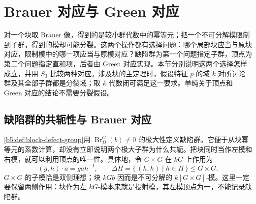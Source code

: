 
\section{Brauer 对应与 Green 对应}
\label{b5:sec:0806}

对一个块取 Brauer 像，得到的是较小群代数中的幂等元；把一个不可分解模限制到子群，得到的模却可能分裂。这两个操作都有选择问题：哪个局部块应当与原块对应，限制模中的哪一项应当与原模对应？缺陷群为第一个问题指定子群，顶点为第二个问题指定直和项，后者由 Green 对应实现。本节分别说明这两个选择怎样成立，并用 \(S_3\) 比较两种对应。涉及块的主定理时，假设特征 \(p\) 的域 \(k\) 对所讨论群及其全部子群都是分裂域；取 \(k\) 代数闭可满足这一要求。单纯关于顶点和 Green 对应的结论不需要分裂假设。

\subsection{缺陷群的共轭性与 Brauer 对应}
\label{b5:subsec:0806:01}

\cref{b5:def:block-defect-group}用 \(\operatorname{Br}_D^G(b)\ne0\) 的极大性定义缺陷群。它便于从块幂等元的系数计算，却没有立即说明两个极大子群为什么共轭。把块同时当作左模和右模，就可以利用顶点的唯一性。具体地，令 \(G\times G\) 在 \(kG\) 上作用为
\[
	(g,h)\cdot a=gah^{-1},\qquad
	\Delta H=\{\,(h,h)\mid h\in H\,\}\le G\times G.
\]
\(G\times G\) 的子模恰是双侧理想；块 \(kGb\) 因而是不可分解的 \(k[G\times G]\)-模。这里一定要保留两侧作用：块作为左 \(kG\)-模本来就是投射模，其左模顶点为一，不能记录缺陷群。

